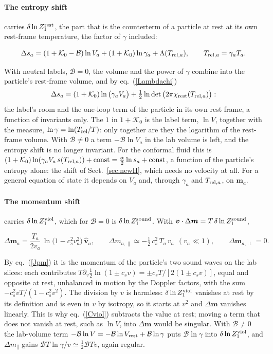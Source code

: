 \documentclass[11pt,aps,preprint,nofootinbib,superscriptaddress,tightenlines]{revtex4-2}
\newcommand{\klab}{\mathcal B}
\def\st{\begin{equation}}
\def\stp{\end{equation}}
\def\Eq#1{eq.~(\ref{#1})}
\def\Sect#1{Sect.~\ref{#1}}
\let\oldparagraph\paragraph
\renewcommand{\paragraph}{\par\bigskip\oldparagraph}
\begin{document}
\paragraph{The entropy shift} carries $\delta\ln Z_1^{\rm rest}$, the part that is the counterterm of a particle at rest at its own rest-frame temperature, the factor of $\gamma$ included:
\begin{keyeq}
\st
\Delta s_a=(1+\mathcal K_0-\klab)\ln V_a+(1+\mathcal K_0)\ln\gamma_a+\Lambda(T_{{\rm rel},a}),\qquad T_{{\rm rel},a}=\gamma_aT_a .
\label{Dsa}
\stp
\end{keyeq}
With neutral labels, $\klab=0$, the volume and the power of $\gamma$ combine into the particle's rest-frame volume, and by \Eq{Lambdachi}
\st
\Delta s_a=(1+\mathcal K_0)\ln\big(\gamma_aV_a\big)+\tfrac12\ln\det\big(2\pi\chi_{\rm rest}(T_{{\rm rel},a})\big) :
\label{Dsainv}
\stp
the label's room and the one-loop term of the particle in its own rest frame, a function of invariants only.  The $1$ in $1+\mathcal K_0$ is the label term, $\ln V$,
together with the measure, $\ln\gamma=\ln(T_{\rm rel}/T)$: only together are they the logarithm of the rest-frame volume.  With $\klab\neq0$ a term $-\klab\ln V_a$ in the lab
volume is left, and the entropy shift is no longer invariant.  For the conformal fluid this is $(1+\mathcal K_0)\ln(\gamma_aV_a\,s(T_{{\rm rel},a}))+\text{const}=\tfrac\alpha2\ln s_a+\text{const}$, a function of the particle's entropy alone:
the shift of \Sect{sec:newH}, which needs no velocity at all.  For a general equation of state it depends on $V_a$ and, through $\gamma_a$ and $T_{{\rm rel},a}$, on $\bm m_a$.

\paragraph{The momentum shift} carries $\delta\ln Z_1^{\rm viol}$, which for $\klab=0$ is $\delta\ln Z_1^{\rm sound}$.  With $\bm v\cdot\Delta\bm m=T\,\delta\ln Z_1^{\rm sound}$,
\begin{keyeq}
\st
\Delta\bm m_a=\frac{T_a}{2v_a}\,\ln\big(1-c_s^2v_a^2\big)\,\hat{\bm v}_a,\qquad \Delta m_{a,\parallel}\simeq-\tfrac12\,c_s^2\,T_a\,v_a\ \ (v_a\ll1),\qquad \Delta\bm m_{a,\perp}=0 .
\label{Dma}
\stp
\end{keyeq}
By \Eq{Jpm} it is the momentum of the particle's two sound waves on the lab slices: each contributes $T\partial_v\tfrac12\ln(1\pm c_sv)=\pm c_sT/[2(1\pm c_sv)]$, equal and
opposite at rest, unbalanced in motion by the Doppler factors, with the sum $-c_s^2vT/(1-c_s^2v^2)$.  The division by $v$ is harmless: $\delta\ln Z_1^{\rm viol}$ vanishes at rest by its
definition and is even in $v$ by isotropy, so it starts at $v^2$ and $\Delta\bm m$ vanishes linearly.  This is why \Eq{Cviol} subtracts the value at rest; moving a term
that does not vanish at rest, such as $\ln V$, into $\Delta\bm m$ would be singular.  With $\klab\neq0$ the lab-volume term $-\klab\ln V=-\klab\ln V_{\rm rest}+\klab\ln\gamma$
puts $\klab\ln\gamma$ into $\delta\ln Z_1^{\rm viol}$, and $\Delta m_\parallel$ gains $\klab T\ln\gamma/v\simeq\tfrac12\klab Tv$, again regular.
\end{document}

